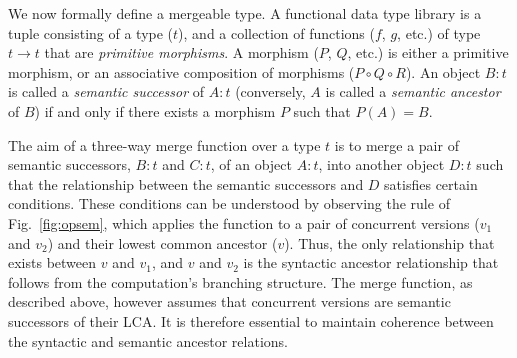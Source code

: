 We now formally define a mergeable type.  A functional data type
library is a tuple consisting of a type ($t$), and a collection of
functions ($f$, $g$, etc.) of type $t \rightarrow t$ that are
\emph{primitive morphisms}. A morphism ($P$, $Q$, etc.) is either a
primitive morphism, or an associative composition of morphisms ($P
\circ Q \circ R$). An object $B:t$ is called a \emph{semantic
successor} of $A:t$ (conversely, $A$ is called a \emph{semantic
ancestor} of $B$) if and only if there exists a morphism $P$ such that
$P(A) = B$.

The aim of a three-way merge function over a type $t$ is to merge a
pair of semantic successors, $B:t$ and $C:t$, of an object $A:t$, into
another object $D:t$ such that the relationship between the semantic
successors and $D$ satisfies certain conditions. These conditions can
be understood by observing the  rule of
Fig.~\ref{fig:opsem}, which applies the  function to a pair
of concurrent versions ($v_1$ and $v_2$) and their lowest common
ancestor ($v$). Thus, the only relationship that exists between $v$
and $v_1$, and $v$ and $v_2$ is the syntactic ancestor relationship
that follows from the computation's branching structure. The merge
function, as described above, however assumes that concurrent versions
are semantic successors of their LCA.  It is therefore essential to
maintain coherence between the syntactic and semantic ancestor
relations.

